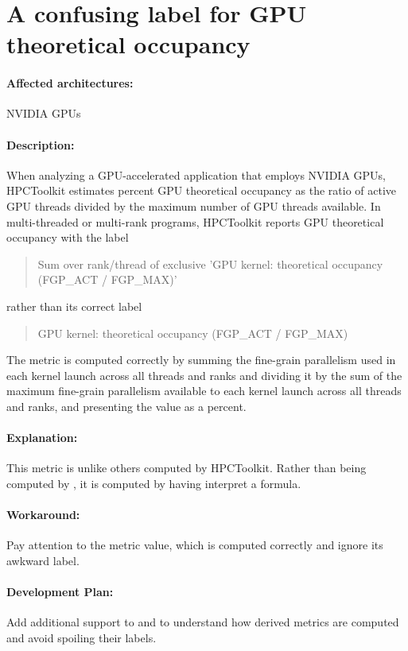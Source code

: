 \documentclass[11pt,twoside,letterpaper]{report}
\begin{document}
\section{A confusing label for GPU theoretical occupancy}
\paragraph{Affected architectures:}  NVIDIA GPUs

\paragraph{Description:} When analyzing a GPU-accelerated application that employs NVIDIA GPUs, HPCToolkit estimates percent GPU theoretical occupancy as the ratio of active GPU threads divided by the maximum number of GPU threads available. In multi-threaded or multi-rank programs, HPCToolkit reports GPU  theoretical occupancy with the label

\begin{quote}
Sum over rank/thread of exclusive 'GPU kernel: theoretical occupancy (FGP\_ACT / FGP\_MAX)'
\end{quote}

\noindent rather than its correct label

\begin{quote}
GPU kernel: theoretical occupancy (FGP\_ACT / FGP\_MAX)
\end{quote}

The metric is computed correctly by summing the fine-grain parallelism used in each kernel launch across all threads and ranks and dividing it by the sum of the maximum fine-grain parallelism available to each kernel launch across all threads and ranks, and presenting the value as a percent.

\paragraph{Explanation:} This metric is unlike others computed by HPCToolkit. Rather than being computed by \hpcprof{}, it is computed by having \hpcviewer{} interpret a formula.

\paragraph{Workaround:} Pay attention to the metric value, which is computed correctly and ignore its awkward label.


\paragraph{Development Plan:}  Add additional support to  \hpcrun{} and \hpcprof{} to understand how derived metrics are computed and avoid spoiling their labels.
\end{document}

